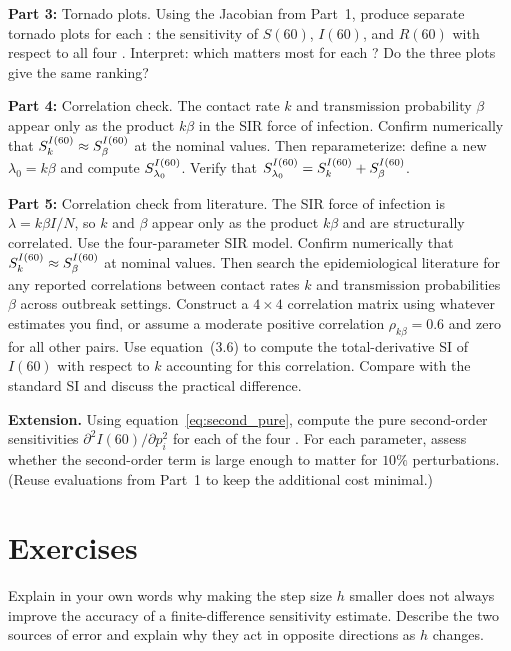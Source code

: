 \textbf{Part 3:} Tornado plots.
Using the Jacobian from Part~1, produce separate tornado plots
for each \QOI: the sensitivity of $S(60)$, $I(60)$, and $R(60)$
with respect to all four \POIs. Interpret: which \POI matters
most for each \QOI? Do the three plots give the same ranking?

\textbf{Part 4:} Correlation check.
The contact rate $k$ and transmission probability $\beta$
appear only as the product $k\beta$ in the SIR force of infection.
Confirm numerically that $S_{k}^{I(60)} \approx S_{\beta}^{I(60)}$
at the nominal values. Then reparameterize: define a new \POI
$\lambda_0 = k\beta$ and compute $S_{\lambda_0}^{I(60)}$.
Verify that $S_{\lambda_0}^{I(60)} = S_{k}^{I(60)} + S_{\beta}^{I(60)}$.

\textbf{Part 5:} Correlation check from literature.
The SIR force of infection is $\lambda = k\beta I/N$, so $k$ and $\beta$
appear only as the product $k\beta$ and are structurally correlated.
Use the four-parameter SIR model. Confirm numerically that
$S_{k}^{I(60)} \approx S_{\beta}^{I(60)}$ at nominal values.
Then search the epidemiological literature for any reported correlations
between contact rates $k$ and transmission probabilities $\beta$
across outbreak settings.
Construct a $4\times4$ correlation matrix using whatever estimates you find,
or assume a moderate positive correlation $\rho_{k\beta} = 0.6$
and zero for all other pairs.
Use equation~(3.6) to compute the total-derivative SI of $I(60)$
with respect to $k$ accounting for this correlation.
Compare with the standard SI and discuss the practical difference.

\textbf{Extension.}
Using equation~\eqref{eq:second_pure}, compute the pure second-order
sensitivities $\partial^2 I(60)/\partial p_i^2$ for each of the
four \POIs. For each parameter, assess whether the second-order
term is large enough to matter for $10\%$ perturbations.
(Reuse evaluations from Part~1 to keep the additional cost minimal.)

\section{Exercises}
\label{sec:ch3exercises}

\begin{exercise}[\bloom{L2}]
\label{ex:ch3:ucurve}
Explain in your own words why making the step size $h$ smaller
does not always improve the accuracy of a finite-difference
sensitivity estimate. Describe the two sources of error and
explain why they act in opposite directions as $h$ changes.
\end{exercise}

